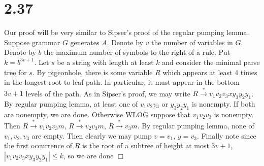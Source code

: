 \documentclass{article}
\begin{document}
\section*{2.37}
Our proof will be very similar to Sipser's proof of the regular pumping lemma. Suppose grammar $G$ generates $A$. Denote by $v$ the number of variables in $G$. Denote by $b$ the maximum number of symbols to the right of a rule. Put $k = b^{3v+1}$. Let $s$ be a string with length at least $k$ and consider the minimal parse tree for $s$. By pigeonhole, there is some variable $R$ which appears at least 4 times in the longest root to leaf path. In particular, it must appear in the bottom $3v+1$ levels of the path. As in Sipser's proof, we may write $R \overset{*}{\to} v_1v_2v_3xy_3y_2y_1$. By regular pumping lemma, at least one of $v_1v_2v_3$ or $y_3y_2y_1$ is nonempty. If both are nonempty, we are done. Otherwise WLOG suppose that $v_1v_2v_3$ is nonempty. Then $R \overset{*}{\to} v_1v_2v_3m$, $R \overset{*}{\to} v_2v_3m$, $R \overset{*}{\to} v_3m$. By regular pumping lemma, none of $v_1,v_2,v_3$ are empty. Then clearly we may pump $v=v_1$, $y=v_3$. Finally note since the first occurrence of $R$ is the root of a subtree of height at most $3v+1$, $|v_1v_2v_3xy_3y_2y_1| \leqslant k$, so we are done $\Box$

\end{document}
